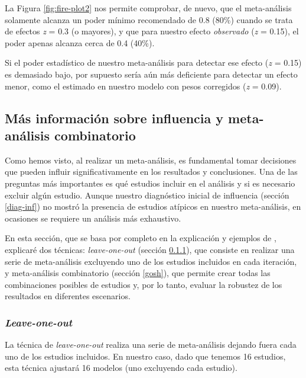 \documentclass[
  bookmarksnumbered]{article}
\begin{document}
La Figura \ref{fig:fire-plot2} nos permite comprobar, de nuevo, que el meta-análisis solamente alcanza un poder mínimo recomendado de 0.8 (80\%) cuando se trata de efectos \emph{z} = 0.3 (o mayores), y que para nuestro efecto \emph{observado} (\emph{z} = 0.15), el poder apenas alcanza cerca de 0.4 (40\%).

Si el poder estadístico de nuestro meta-análisis para detectar ese efecto (\emph{z} = 0.15) es demasiado bajo, por supuesto sería aún más deficiente para detectar un efecto menor, como el estimado en nuestro modelo con pesos corregidos (\emph{z} = 0.09).

\hypertarget{todas-combinaciones}{%
\subsection{Más información sobre influencia y meta-análisis combinatorio}\label{todas-combinaciones}}

Como hemos visto, al realizar un meta-análisis, es fundamental tomar decisiones que pueden influir significativamente en los resultados y conclusiones. Una de las preguntas más importantes es qué estudios incluir en el análisis y si es necesario excluir algún estudio. Aunque nuestro diagnóstico inicial de influencia (sección \ref{diag-inf}) no mostró la presencia de estudios atípicos en nuestro meta-análisis, en ocasiones se requiere un análisis más exhaustivo.

En esta sección, que se basa por completo en la explicación y ejemplos de \textcite{quintanaOhMyGOSH2020}, explicaré dos técnicas: \emph{leave-one-out} (sección \ref{leave-one-out}), que consiste en realizar una serie de meta-análisis excluyendo uno de los estudios incluidos en cada iteración, y meta-análisis combinatorio (sección \ref{gosh}), que permite crear todas las combinaciones posibles de estudios y, por lo tanto, evaluar la robustez de los resultados en diferentes escenarios.

\hypertarget{leave-one-out}{%
\subsubsection{\texorpdfstring{\emph{Leave-one-out}}{Leave-one-out}}\label{leave-one-out}}

La técnica de \emph{leave-one-out} realiza una serie de meta-análisis dejando fuera cada uno de los estudios incluidos. En nuestro caso, dado que tenemos 16 estudios, esta técnica ajustará 16 modelos (uno excluyendo cada estudio).
\end{document}
